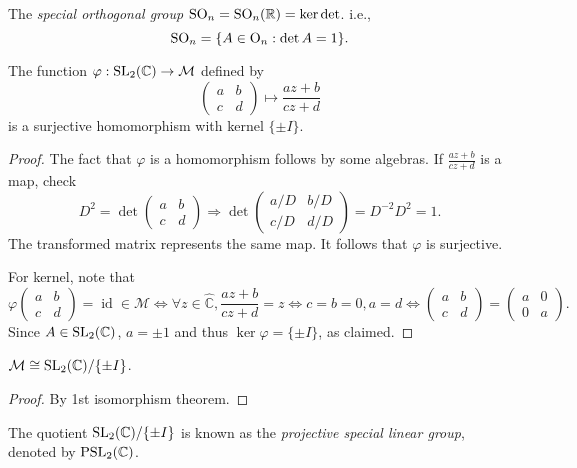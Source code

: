 \documentclass[a4paper]{article}
\begin{document}
\begin{definition}
  The \textit{special orthogonal group} $ \mathrm{SO}_n=\mathrm{SO}_n(\mathbb{R}) =
  \ker \det $. i.e.,
  \[
    \mathrm{SO}_n=\{A\in \mathrm{O}_n:\det A=1\}.
  \]
\end{definition}
\begin{proposition}\label{prop:7.6}
  The function $ \varphi:\mathrm{SL}_2(\mathbb{C})\to \mathcal{M} $ defined by
  \[
    \begin{pmatrix}
      a&b\\
      c&d
    \end{pmatrix} \mapsto \frac{az+b}{cz+d}
  \]
  is a surjective homomorphism with kernel $ \{\pm I\} $.
\end{proposition}
\begin{proof}
  The fact that $ \varphi $ is a homomorphism follows by some
  algebras. If $ \frac{az+b}{cz+d} $ is a \mobius map, check
  \[
    D^2=\det
    \begin{pmatrix}
      a&b\\
      c&d
    \end{pmatrix} \Longrightarrow \det
    \begin{pmatrix}
      a/D&b/D\\
      c/D&d/D
    \end{pmatrix}=D^{-2}D^2=1.
  \]
  The transformed matrix represents the same \mobius map. It follows
  that $ \varphi $ is surjective.

  For kernel, note that
  \[
    \varphi
    \begin{pmatrix}
      a&b\\
      c&d
    \end{pmatrix}=\operatorname{id}\in \mathcal{M}
    \Longleftrightarrow \forall z\in
    \hat{\mathbb{C}},\frac{az+b}{cz+d}=z \Longleftrightarrow
    c=b=0,a=d \Longleftrightarrow
    \begin{pmatrix}
      a&b\\
      c&d
    \end{pmatrix}=
    \begin{pmatrix}
      a&0\\
      0&a
    \end{pmatrix}.
  \]
  Since $ A\in \mathrm{SL}_2(\mathbb{C}) $, $a=\pm 1$ and thus $ \ker
  \varphi=\{\pm I\} $, as claimed.
\end{proof}
\begin{corollary}\label{col:7.7}
  $ \mathcal{M} \cong \mathrm{SL}_2(\mathbb{C})/\{\pm I\} $.
\end{corollary}
\begin{proof}
  By 1st isomorphism theorem.
\end{proof}
\begin{remark}
  The quotient $\mathrm{SL}_2(\mathbb{C})/\{\pm I\}$ is known as the
  \textit{projective special linear group}, denoted by $ \mathrm{PSL}_2(\mathbb{C}) $.
\end{remark}
\end{document}
